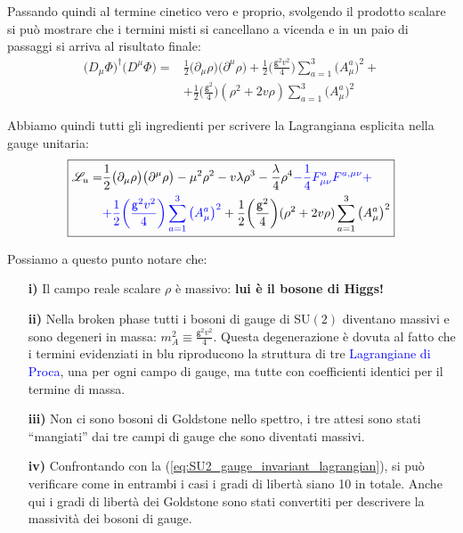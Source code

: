 \documentclass[../main.tex]{subfiles}
\begin{document}
\begin{itemize}
    Passando quindi al termine cinetico vero e proprio, svolgendo il prodotto scalare si può mostrare che i termini misti si cancellano a vicenda e in un paio di passaggi si arriva al risultato finale:
    \begin{align*}
        \big(D_\mu\Phi\big)^\dagger\big(D^\mu\Phi\big) =& \frac{1}{2} \big(\partial_\mu\rho\big)\big(\partial^\mu\rho\big) +\frac{1}{2} \bigg(\frac{\mathsf g^2 v^2}{4}\bigg)\sum_{a=1}^3\big(A_\mu^a\big)^2 +\\
        &+ \frac{1}{2} \bigg(\frac{\mathsf g^2}{4} \bigg) (\rho^2+2v\rho)\sum_{a=1}^3\big(A_\mu^a\big)^2
    \end{align*}    
\end{itemize}

Abbiamo quindi tutti gli ingredienti per scrivere la Lagrangiana esplicita nella gauge unitaria:
\begin{equation}
    \boxed{
    \begin{aligned}
        \mathscr{L}_u =& \frac{1}{2} \big(\partial_\mu\rho\big)\big(\partial^\mu\rho\big) - \mu^2\rho^2 - v\lambda\rho^3 - \frac{\lambda}{4}\rho^4 \textcolor{blue}{- \frac{1}{4}F_{\mu\nu}^aF^{a,\mu\nu} +}\\
        &\textcolor{blue}{+\frac{1}{2} \bigg(\frac{\mathsf g^2 v^2}{4}\bigg)\sum_{a=1}^3\big(A_\mu^a\big)^2} + \frac{1}{2} \bigg(\frac{\mathsf g^2}{4} \bigg) (\rho^2+2v\rho)\sum_{a=1}^3\big(A_\mu^a\big)^2
    \end{aligned}
    }
    \label{eq:unitary_gauged_lagrangian_nonabelian_explicit}
\end{equation}

Possiamo a questo punto notare che:
\begin{enumerate}
    \item[\textbf{i)}] Il campo reale scalare $\rho$ è massivo: \textbf{lui è il bosone di Higgs!}
    
    \item[\textbf{ii)}] Nella broken phase tutti i bosoni di gauge di SU$(2)$ diventano massivi e sono degeneri in massa: $m_A^2\equiv \frac{\mathsf g^2 v^2}{4}$. Questa degenerazione è dovuta al fatto che i termini evidenziati in blu riproducono la struttura di tre \textcolor{blue}{Lagrangiane di Proca}, una per ogni campo di gauge, ma tutte con coefficienti identici per il termine di massa.
    
    \item[\textbf{iii)}] Non ci sono bosoni di Goldstone nello spettro, i tre attesi sono stati “mangiati” dai tre campi di gauge che sono diventati massivi.

    \item[\textbf{iv)}] Confrontando con la (\ref{eq:SU2_gauge_invariant_lagrangian}), si può verificare come in entrambi i casi i gradi di libertà siano 10 in totale. Anche qui i gradi di libertà dei Goldstone sono stati convertiti per descrivere la massività dei bosoni di gauge.
\end{enumerate}
\end{document}
